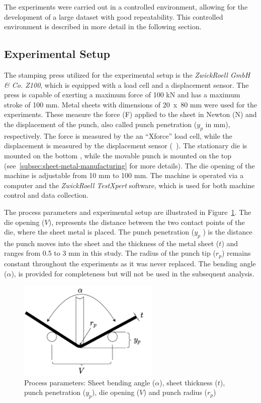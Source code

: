 The experiments were carried out in a controlled environment, allowing for the development of a large dataset with
good repeatability.
This controlled environment is described in more detail in the following section.

\subsection{Experimental Setup}\label{subsec:experimental-setup}
The stamping press utilized for the experimental setup is the \textit{ZwickRoell GmbH \& Co. Z100}, which is
equipped with a load cell and a displacement sensor.
The press is capable of exerting a maximum force of 100 kN and has a maximum stroke of 100 mm.
Metal sheets with dimensions of 20~x~80 mm were used for the experiments.
These measure the force (F) applied to the sheet in Newton (N) and the displacement of the punch, also called
punch penetration ($y_p$ in mm), respectively.
The force is measured by the an ``Xforce'' load cell, while the displacement is measured by the displacement sensor
(~\cite{_xforceloadcell_}).
The stationary die is mounted on the bottom , while the movable punch is mounted on the top
(see~\cref{subsec:sheet-metal-manufacturing} for more details).
The die opening of the machine is adjustable from 10 mm to 100 mm.
The machine is operated via a computer and the \textit{ZwickRoell TestXpert} software, which is used for both machine
control and data collection.

The process parameters and experimental setup are illustrated in Figure~\ref{fig:process_parameters}.
The die opening ($V$), represents the distance between the two contact points of the die, where the sheet metal is
placed.
The punch penetration ($y_p$ ) is the distance the punch moves into the sheet and
the thickness of the metal sheet ($t$) and ranges from 0.5 to 3 mm in this study.
The radius of the punch tip ($r_p$) remains constant throughout the experiments as it was never replaced.
The bending angle ($\alpha$), is provided for completeness but will not be used in the subsequent analysis.

\begin{figure}[h]
    \begin{tcolorbox}[arc=0pt,boxrule=0.5pt]
        \centering
        \includegraphics[trim=left botm right top, width=0.6\textwidth,
            clip]{chap4/images/process_parameters}
    \end{tcolorbox}
    \caption{Process parameters: Sheet bending angle ($\alpha$), sheet
    thickness ($t$), punch
    penetration ($y_p$), die opening ($V$) and punch radius ($r_p$)}
    \label{fig:process_parameters}
\end{figure}

